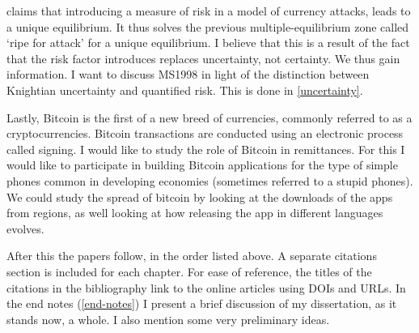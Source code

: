 \documentclass[a4paper]{report}
\begin{document}
\begin{refsection}

\textcite{morris1998unique} claims that introducing a measure of risk in a model of currency attacks, leads to a unique equilibrium.
It thus solves the previous multiple-equilibrium zone called `ripe for attack' for a unique equilibrium.
I believe that this is a result of the fact that the risk factor introduces replaces uncertainty, not certainty.
We thus gain information.
I want to discuss MS1998 in light of the distinction between Knightian uncertainty and quantified risk.
This is done in \autoref{uncertainty}.

Lastly, Bitcoin is the first of a new breed of currencies, commonly referred to as a cryptocurrencies. 
Bitcoin transactions are conducted using an electronic process called signing.
I would like to study the role of Bitcoin in remittances.
For this I would like to participate in building Bitcoin applications for the type of simple phones common in developing economies (sometimes referred to a stupid phones).
We could study the spread of bitcoin by looking at the downloads of the apps from regions,
as well looking at how releasing the app in different languages evolves.

After this the papers follow, in the order listed above.
A separate citations section is included for each chapter.
For ease of reference, the titles of the citations in the bibliography link to the online articles using DOIs and URLs.
In the end notes (\autoref{end-notes}) I present a brief discussion of my dissertation, as it stands now, a whole.
I also mention some very preliminary ideas.

\printbibliography
\end{refsection}
\end{document}
